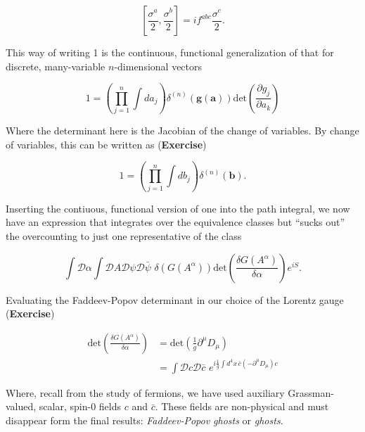 \begin{equation}
\left[ \frac{\sigma^a}{2}, \frac{\sigma^b}{2} \right] = i f^{abc} \frac{\sigma^c}{2}.
\end{equation}

\noindent This way of writing 1 is the continuous, functional generalization of that for discrete, many-variable $n$-dimensional vectors

\begin{equation}
1 = \left( \prod_{j=1}^n \int d a_j \right) \delta^{(n)} (\textbf{g}(\textbf{a})) \text{det} \left( \frac{\partial g_j}{\partial a_k} \right)
\end{equation}

\noindent Where the determinant here is the Jacobian of the change of variables. By change of variables, this can be written as (\textbf{Exercise})

\begin{equation}
1 = \left( \prod_{j=1}^n \int d b_j \right) \delta^{(n)} (\textbf{b}).
\end{equation}

\noindent Inserting the contiuous, functional version of one into the path integral, we now have an expression that integrates over the equivalence classes but ``sucks out'' the overcounting to just one representative of the class

\begin{equation}
\int \mathcal{D} \alpha \int \mathcal{D} A \mathcal{D} \psi \mathcal{D} \bar{\psi} \,\, \delta(G(A^\alpha)) \text{det} \left( \frac{\delta G(A^\alpha)}{\delta \alpha} \right) e^{i S}.
\end{equation}

\noindent Evaluating the Faddeev-Popov determinant in our choice of the Lorentz gauge (\textbf{Exercise})

\begin{align}
\text{det} \left( \frac{\delta G(A^\alpha)}{\delta \alpha} \right) &= \text{det} \left( \frac{1}{g} \partial^\mu D_\mu \right) \\
&= \int \mathcal{D} c \mathcal{D} \bar{c} \,\, e^{i \frac{1}{g} \int d^4 x \, \bar{c} (-\partial^\mu D_\mu) c}
\end{align}

\noindent Where, recall from the study of fermions, we have used auxiliary Grassman-valued, scalar, spin-0 fields $c$ and $\bar{c}$. These fields are non-physical and must disappear form the final results: \textit{Faddeev-Popov ghosts} or \textit{ghosts}. \\

